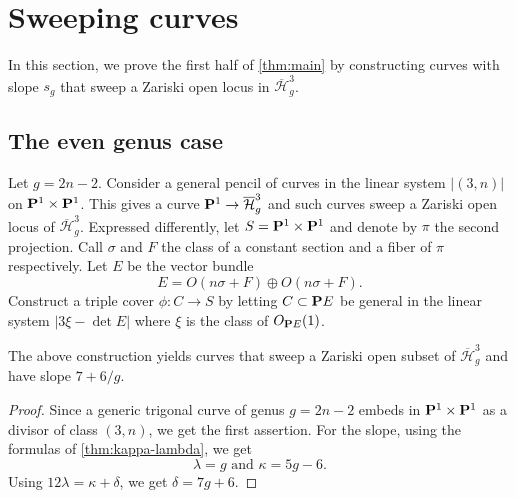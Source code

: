 \documentclass{amsart}
\renewcommand {\P}{{\bf P}}
\newcommand {\from}{{\colon}}
\newcommand{\orb}[1]{{\mathcal #1}}     %
\renewcommand {\o}[1]{\overline{#1}}
\renewcommand{\o}{\overline}
\begin{document}
\section{Sweeping curves}\label{sec:curve}
In this section, we prove the first half of \autoref{thm:main} by constructing curves with slope $s_g$ that sweep a Zariski open locus in $\o{\orb   H}^3_g$.
\subsection{The even genus case}\label{sec:even_curve}
Let $g = 2n-2$. Consider a general pencil of curves in the linear system $|(3,n)|$ on $\P^1 \times \P^1$. This gives a curve $\P^1 \to \o{\orb H}^3_g$ and such curves sweep a Zariski open locus of $\o{\orb H}^3_g$. Expressed differently, let $S = \P^1 \times \P^1$ and denote by $\pi$ the second projection. Call $\sigma$ and $F$ the class of a constant section and a fiber of $\pi$ respectively. Let $E$ be the vector bundle
\[ E = O(n \sigma + F) \oplus O(n \sigma + F).\]
Construct a triple cover $\phi \from C \to S$ by letting $C \subset \P E$ be general in the linear system $|3\xi - \det E|$ where $\xi$ is the class of $O_{\P E}(1)$. 
\begin{proposition}\label{thm:even_sweeping}
  The above construction yields curves that sweep a Zariski open subset of $\o{\orb H}^3_g$ and have slope $7 + 6/g$.
\end{proposition}
\begin{proof}
  Since a generic trigonal curve of genus $g = 2n-2$ embeds in $\P^1\times\P^1$ as a divisor of class $(3, n)$, we get the first assertion. For the slope, using the formulas of \autoref{thm:kappa-lambda}, we get
\[ \lambda = g \text{ and } \kappa = 5g-6.\]
Using $12 \lambda = \kappa + \delta$, we get $\delta = 7g+6$.
\end{proof}
\end{document}
